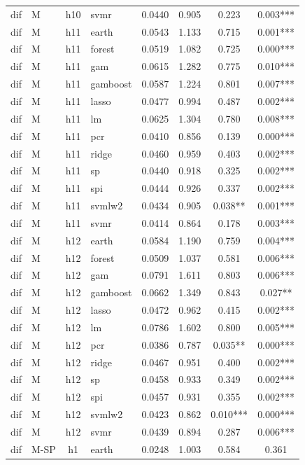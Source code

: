 \begin{ThreePartTable}
\begin{longtable}[t]{llclcccc}
dif & M & h10 & svmr & 0.0440 & 0.905 & 0.223 & 0.003***\\
\addlinespace
dif & M & h11 & earth & 0.0543 & 1.133 & 0.715 & 0.001***\\
dif & M & h11 & forest & 0.0519 & 1.082 & 0.725 & 0.000***\\
dif & M & h11 & gam & 0.0615 & 1.282 & 0.775 & 0.010***\\
dif & M & h11 & gamboost & 0.0587 & 1.224 & 0.801 & 0.007***\\
dif & M & h11 & lasso & 0.0477 & 0.994 & 0.487 & 0.002***\\
dif & M & h11 & lm & 0.0625 & 1.304 & 0.780 & 0.008***\\
dif & M & h11 & pcr & 0.0410 & 0.856 & 0.139 & 0.000***\\
dif & M & h11 & ridge & 0.0460 & 0.959 & 0.403 & 0.002***\\
dif & M & h11 & sp & 0.0440 & 0.918 & 0.325 & 0.002***\\
dif & M & h11 & spi & 0.0444 & 0.926 & 0.337 & 0.002***\\
dif & M & h11 & svmlw2 & 0.0434 & 0.905 & 0.038** & 0.001***\\
dif & M & h11 & svmr & 0.0414 & 0.864 & 0.178 & 0.003***\\
\addlinespace
dif & M & h12 & earth & 0.0584 & 1.190 & 0.759 & 0.004***\\
dif & M & h12 & forest & 0.0509 & 1.037 & 0.581 & 0.006***\\
dif & M & h12 & gam & 0.0791 & 1.611 & 0.803 & 0.006***\\
dif & M & h12 & gamboost & 0.0662 & 1.349 & 0.843 & 0.027**\\
dif & M & h12 & lasso & 0.0472 & 0.962 & 0.415 & 0.002***\\
dif & M & h12 & lm & 0.0786 & 1.602 & 0.800 & 0.005***\\
dif & M & h12 & pcr & 0.0386 & 0.787 & 0.035** & 0.000***\\
dif & M & h12 & ridge & 0.0467 & 0.951 & 0.400 & 0.002***\\
dif & M & h12 & sp & 0.0458 & 0.933 & 0.349 & 0.002***\\
dif & M & h12 & spi & 0.0457 & 0.931 & 0.355 & 0.002***\\
dif & M & h12 & svmlw2 & 0.0423 & 0.862 & 0.010*** & 0.000***\\
dif & M & h12 & svmr & 0.0439 & 0.894 & 0.287 & 0.006***\\
\addlinespace
dif & M-SP & h1 & earth & 0.0248 & 1.003 & 0.584 & 0.361\\

\end{longtable}
\end{ThreePartTable}
